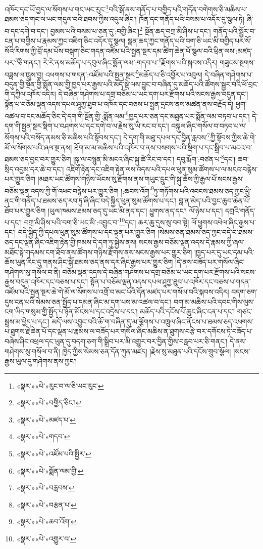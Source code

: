 འཁོར་དང་ཡོ་བྱད་ལ་སོགས་པ་གང་ཡང་རུང་\footnote{«སྣར་»«པེ་»རུང་བ་ལ་ཅི་ཡང་རུང་}བའི་སྒོ་ནས་གནོད་པ་བགྱིད་པའི་གདོན་བགེགས་ཅི་མཆིས་པ་ཐམས་ཅད་གང་ལ་ཡང་གདུལ་བའི་ཐབས་ཀྱིས་འདུལ་ཞིང་། ཁོན་དང་གནོད་པའི་བསམ་པ་འདོར་དུ་སྩལ་ཏེ། ཞི་བ་དང་དགེ་བ་དང་། བྱམས་པའི་བསམ་པ་ཅན་དུ་:བགྱི་ཞིང་།\footnote{«སྣར་»«པེ་»བགྱིད་ཅིང་།} སྔོན་ཆད་བཀྲ་མི་ཤིས་པ་དང་། གནོད་པའི་སྦྱོར་བ་ངན་པ་བགྱིས་པ་རྣམས་ཀྱང་འཇིག་ཅིང་འདོར་དུ་སྩལ། སླན་ཆད་ཀྱང་གནོད་པའི་བག་ཅི་ཡང་མི་བགྱིད་པར་སོ་སོའི་རིགས་ཀྱི་བྲོ་དམ་པོས་བསྒག་ཅིང་གདན་འཛོམ་པའི་སྤྱན་སྔར་དམ་ཚིག་ཆེན་པོ་སྩལ་བའི་ཕྲིན་ལས་:མཛད་པར་\footnote{«སྣར་»«པེ་»མཛད་པ་}ཅི་གནང་། རེ་རེ་ནས་མཆོད་པ་དབུལ་ཞིང་སྨོན་ལམ་:གདབ་པ་\footnote{«སྣར་»«པེ་»གདབ་}རྫོགས་པའི་སྐབས་འདིར། གཟུངས་སྔགས་བཟླས་ལ་ཁྲུས་བྱ། འཕགས་པ་གདན་:འཛོམ་པའི་སྤྱན་སྔར་\footnote{«སྣར་»«པེ་»འཛོམ་པའི་སྤྱིར་}མཆོད་པ་ཅི་འབྱོར་པ་འབུལ། དེ་བཞིན་གཤེགས་པ་བདུན་གྱི་སྔོན་གྱི་སྨོན་ལམ་གྱི་ཁྱད་པར་རྒྱས་པའི་མདོ་སྡེ་ལས་བྱུང་བ་བཞིན་དུ་མཆོད་པའི་ཚོགས་སྦྱར་བའི་ཕོ་བྲང་གི་དཀྱིལ་འཁོར་འདིར། དེ་བཞིན་གཤེགས་པ་དགྲ་བཅོམ་པ་ཡང་དག་པར་རྫོགས་པའི་སངས་རྒྱས་བདུན་དང་། སྟོན་པ་བཅོམ་ལྡན་འདས་དཔལ་ཤཱཀྱ་ཐུབ་པ་འཁོར་དང་བཅས་པ་སྤྱན་དྲངས་ནས་མཚན་ནས་བརྗོད་དེ། ཕྱག་འཚལ་བ་དང་མཆོད་ཅིང་དེ་དག་གི་སྔོན་གྱི་:སྨོན་ལམ་\footnote{«སྣར་»«པེ་»སྨོན་ལམ་གྱི་}ཁྱད་པར་ཅན་དང་མཐུན་པར་སྨོན་ལམ་བཏབ་པ་དང་། དེ་དག་གི་སྤྱན་སྔར་སྡིག་པ་བཤགས་པ་དང་དགེ་བ་ལ་རྗེས་སུ་ཡི་རང་བ་དང་། བསྐུལ་ཞིང་གསོལ་བ་བཏབ་པ་ལ་སོགས་པའི་བསོད་ནམས་ཅི་མཆིས་པའི་སྟོབས་དང་། དེ་དག་གི་མཐུ་དཔལ་དང་བྱིན་རླབས་\footnote{«སྣར་»«པེ་»བརླབས་}ཀྱི་སྟོབས་ཀྱིས་ཆེ་གེ་མོ་ལ་སོགས་པའི་ཞལ་སྔ་ནས། ཐོག་མ་མ་མཆིས་པའི་འཁོར་བ་ནས་བསགས་པའི་སྡིག་པ་དང་སྒྲིབ་པ་མངའ་བ་ཐམས་ཅད་བྱང་བར་གྱུར་ཅིག །སྐུ་ལ་བསྙུན་མི་མངའ་ཞིང་སྐུ་ཚེ་རིང་བ་དང་། དབུ་རྨོག་:བཙན་པ་\footnote{«སྣར་»«པེ་»བརྩན་པ་}དང་། ཆབ་སྲིད་འབྱམ་དར་ཆེ་བ་དང་། འཇིག་རྟེན་དང་འཇིག་རྟེན་ལས་འདས་པའི་དཔལ་ཕུན་སུམ་ཚོགས་པ་ལ་མངའ་བརྙེས་པར་གྱུར་ཅིག །མཐར་ཡང་ཚོགས་གཉིས་ཡོངས་སུ་རྫོགས་ནས་གཡུང་དྲུང་གི་སྐུ་ཆོས་ཀྱི་རྒྱལ་པོ་སངས་རྒྱས་བཅོམ་ལྡན་འདས་ཀྱི་གོ་འཕང་བརྙེས་པར་གྱུར་ཅིག །:ཆབས་འོག་\footnote{«སྣར་»«པེ་»ཆབ་འོག་}ཏུ་གཏོགས་པའི་འབངས་ཐམས་ཅད་ཀྱང་ཕྱི་ནང་གི་གནོད་པ་ཐམས་ཅད་རབ་ཏུ་ཞི་ཞིང་བདེ་སྐྱིད་ཕུན་སུམ་ཚོགས་པ་དང་། བླ་ན་མེད་པའི་བྱང་ཆུབ་ཆེན་པོ་ཐོབ་པར་གྱུར་ཅིག །ཡུལ་ཁམས་ཐམས་ཅད་དུ་ཡང་མི་ནད་དང་། ཕྱུགས་ནད་དང་། ལོ་ཉེས་པ་དང་། དགྲའི་གནོད་པ་དང་། བཀྲ་མི་ཤིས་པའི་བག་ཅི་ཡང་མི་:འབྱུང་བ་\footnote{«སྣར་»«པེ་»འགྱུར་བ་}དང་། ཆར་ཆུ་དུས་སུ་བབ་སྟེ། ལོ་ཕྱུགས་འཕེལ་ཞིང་རྒྱས་པ་དང་། བདེ་སྐྱིད་ཀྱི་དཔལ་ཕུན་སུམ་ཚོགས་པ་དང་ལྡན་པར་གྱུར་ཅིག །སེམས་ཅན་ཐམས་ཅད་ཀྱང་བདེ་བ་ཐམས་ཅད་དང་ལྡན་ཞིང་འཇིག་རྟེན་གྱི་ཁམས་དེ་དག་ཏུ་སྐྱེས་ནས། སངས་རྒྱས་བཅོམ་ལྡན་འདས་དེ་རྣམས་ཀྱི་ཞལ་མཐོང་སྟེ་གདམས་ངག་ཐོབ་ནས་ཚོགས་གཉིས་རྫོགས་ནས་སངས་རྒྱས་པར་གྱུར་ཅིག །ཁྱད་པར་དུ་ཡང་དམ་པའི་ཆོས་ཡུན་རིང་དུ་གནས་ཤིང་སྒོ་ཐམས་ཅད་ནས་དར་ཞིང་རྒྱས་པར་གྱུར་ཅིག །དེ་ནས་བཟོད་པར་གསོལ་ཞིང་གཤེགས་སུ་གསོལ་བ་ནི། བཅོམ་ལྡན་འདས་དེ་བཞིན་གཤེགས་པ་དགྲ་བཅོམ་པ་ཡང་དག་པར་རྫོགས་པའི་སངས་རྒྱས་བདུན་འཁོར་དང་བཅས་པ་དང་། སྟོན་པ་བཅོམ་ལྡན་འདས་དཔལ་ཤཱཀྱ་ཐུབ་པ་འཁོར་དང་བཅས་པ་གདན་འཛོམ་པའི་སྤྱན་སྔར་ཆེ་གེ་མོ་ལ་སོགས་པ་འགྲོ་བ་མང་པོའི་དོན་མཛད་པར་གསོལ་བའི་སྐབས་འདིར། བདག་ཅག་དུས་ངན་པའི་སེམས་ཅན་སྤྱོད་པ་དམན་ཞིང་མ་དག་པས་མ་འཚལ་བ་དང་། བག་མ་མཆིས་པའི་དབང་གིས་ལུས་ངག་ཡིད་གསུམ་གྱི་སྤྱོད་པ་ཉོན་མོངས་པ་དང་འདྲེས་པ་དང་། མཆོད་པའི་དངོས་པོ་ཆུང་ཞིང་ངན་པ་དང་། གཙང་སྦྲས་མ་ཕྱེད་པ་དང་། མདོ་ལས་འབྱུང་བའི་ཆོ་ག་བཞིན་དུ་མ་ལྕོགས་པ་འཁྲུལ་ཞིང་ནོངས་པ་ཐམས་ཅད་འཕགས་པ་ཐུགས་རྗེ་ཆེན་པོ་དང་ལྡན་པ་རྣམས་ལ་བཟོད་པར་གསོལ་ཞིང་མཆིས་ན་ཐུགས་བརྩེ་བར་དགོངས་ཏེ་བཟོད་པ་བཞེས་ཤིང་འཕྲལ་དང་ཡུན་དུ་བདག་ཅག་གི་སྒྲིབ་པར་མི་འགྱུར་བར་བྱིན་གྱིས་བརླབ་པར་ཅི་གནང་། དེ་ནས་གཤེགས་སུ་གསོལ་བ་ནི། ཁྱེད་ཀྱིས་སེམས་ཅན་དོན་ཀུན་མཛད། །རྗེས་སུ་མཐུན་པའི་དངོས་གྲུབ་སྩོལ། །སངས་རྒྱས་ཡུལ་དུ་གཤེགས་ནས་ཀྱང་། 